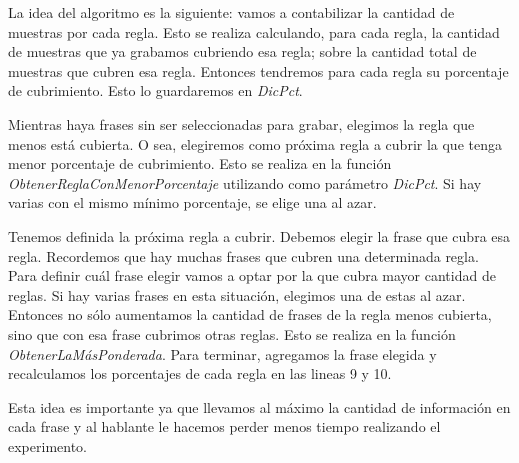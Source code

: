 
La idea del algoritmo es la siguiente: vamos a contabilizar la cantidad de muestras por cada regla. Esto se realiza calculando, para cada regla, la cantidad de muestras que ya grabamos cubriendo esa regla; sobre la cantidad total de muestras que cubren esa regla. Entonces tendremos para cada regla su porcentaje de cubrimiento. Esto lo guardaremos en \textit{DicPct}.

Mientras haya frases sin ser seleccionadas para grabar, elegimos la regla que menos está cubierta. O sea, elegiremos como próxima regla a cubrir la que tenga menor porcentaje de cubrimiento. Esto se realiza en la función \textit{ObtenerReglaConMenorPorcentaje} utilizando como parámetro \textit{DicPct}. Si hay varias con el mismo mínimo porcentaje, se elige una al azar.

Tenemos definida la próxima regla a cubrir. Debemos elegir la frase que cubra esa regla. Recordemos que hay muchas frases que cubren una determinada regla. Para definir cuál frase elegir vamos a optar por la que cubra mayor cantidad de reglas. Si hay varias frases en esta situación, elegimos una de estas al azar. Entonces no sólo aumentamos la cantidad de frases de la regla menos cubierta, sino que con esa frase cubrimos otras reglas. Esto se realiza en la función \textit{ObtenerLaMásPonderada}. Para terminar, agregamos la frase elegida y recalculamos los porcentajes de cada regla en las lineas 9 y 10.

Esta idea es importante ya que llevamos al máximo la cantidad de información en cada frase y al hablante le hacemos perder menos tiempo realizando el experimento.

